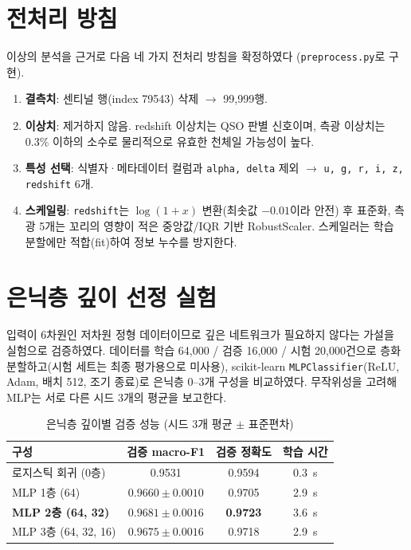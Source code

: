\documentclass[11pt,a4paper]{article}
\begin{document}
\section{전처리 방침}

이상의 분석을 근거로 다음 네 가지 전처리 방침을 확정하였다
(\texttt{preprocess.py}로 구현).

\begin{enumerate}
  \item \textbf{결측치}: 센티널 행(index 79543) 삭제 $\rightarrow$ 99{,}999행.
  \item \textbf{이상치}: 제거하지 않음. redshift 이상치는 QSO 판별 신호이며,
        측광 이상치는 0.3\% 이하의 소수로 물리적으로 유효한 천체일 가능성이 높다.
  \item \textbf{특성 선택}: 식별자·메타데이터 컬럼과 \texttt{alpha, delta} 제외
        $\rightarrow$ \texttt{u, g, r, i, z, redshift} 6개.
  \item \textbf{스케일링}: \texttt{redshift}는 $\log(1+x)$ 변환(최솟값 $-0.01$이라
        안전) 후 표준화, 측광 5개는 꼬리의 영향이 적은 중앙값/IQR 기반
        RobustScaler. 스케일러는 학습 분할에만 적합(fit)하여 정보 누수를 방지한다.
\end{enumerate}

\section{은닉층 깊이 선정 실험}

입력이 6차원인 저차원 정형 데이터이므로 깊은 네트워크가 필요하지 않다는 가설을
실험으로 검증하였다. 데이터를 학습 64{,}000 / 검증 16{,}000 / 시험 20{,}000건으로
층화 분할하고(시험 세트는 최종 평가용으로 미사용), scikit-learn
\texttt{MLPClassifier}(ReLU, Adam, 배치 512, 조기 종료)로 은닉층 0--3개 구성을
비교하였다. 무작위성을 고려해 MLP는 서로 다른 시드 3개의 평균을 보고한다.

\begin{table}[htbp]
\centering
\caption{은닉층 깊이별 검증 성능 (시드 3개 평균 $\pm$ 표준편차)}
\label{tab:depth}
\small
\begin{tabular}{lccc}
\toprule
구성 & 검증 macro-F1 & 검증 정확도 & 학습 시간 \\
\midrule
로지스틱 회귀 (0층) & 0.9531 & 0.9594 & \SI{0.3}{s} \\
MLP 1층 (64) & $0.9660 \pm 0.0010$ & 0.9705 & \SI{2.9}{s} \\
\textbf{MLP 2층 (64, 32)} & $\mathbf{0.9681 \pm 0.0016}$ & \textbf{0.9723} & \SI{3.6}{s} \\
MLP 3층 (64, 32, 16) & $0.9675 \pm 0.0016$ & 0.9718 & \SI{2.9}{s} \\
\bottomrule
\end{tabular}
\end{table}
\end{document}
